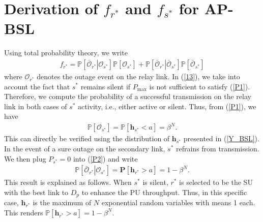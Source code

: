 \documentclass[journal,twocolumn]{IEEEtran}
\begin{document}
\section{Derivation of $f_{r^*}$ and $f_{s^*}$ for AP-BSL} \label{AP-BSL}
Using total probability theory, we write
\begin{align}\label{13}
f_{r^*}= \mathbb{P}\left[ \left. \bar{\mathcal{O}}_{r^*} \right|  \mathcal{O}_{s^*} \right]
\mathbb{P}\left[ \mathcal{O}_{s^*}\right] 
+ \mathbb{P}\left[ \left. \bar{\mathcal{O}}_{r^*} \right|  \bar{\mathcal{O}}_{s^*}\right]
\mathbb{P}\left[ \bar{\mathcal{O}}_{s^*}\right]
\end{align}
where $\mathcal{O}_{r^*}$ denotes the outage event on the relay link. 
In (\ref{13}), we take into account the fact that $s^*$ remains silent if $P_{\mathrm{max}}$ is not sufficient to satisfy (\ref{P1}). Therefore, we
compute the probability of a successful transmission on the relay link in both cases of $s^*$ activity, i.e., either active or silent. Thus, from (\ref{P1}), we have
\begin{align}\label{14}
\mathbb{P}\left[ \mathcal{O}_{s^*} \right]=
\mathbb{P}[\mathbf{h}_{s^*} < a ]=\beta^N.
\end{align}
This can directly be verified using the distribution of $\mathbf{h}_{s^*}$ presented in (\ref{Y_BSL}). 
In the event of a sure outage on the secondary link, $s^*$ refrains from transmission. 
We then plug $P_{s^*}=0$ into (\ref{P2}) and write
\begin{align}\label{15}
\mathbb{P}\left[ \left. \bar{\mathcal{O}}_{r^*} \right| \mathcal{O}_{s^*} \right]=
\mathbf{P}[\mathbf{h}_{r^*} > a ]=1-\beta^N.
\end{align}
This result is explained as follows. When $s^*$ is silent, $r^*$ is selected to be the SU with the best link to $D_{p}$ to enhance the PU throughput. Thus, in this specific case, $\mathbf{h}_{r^*}$ is
the maximum of $N$ exponential random variables with means 1 each. This renders $\mathbb{P}[\mathbf{h}_{r^*} > a]=1-\beta^N$.
 
\end{document}
